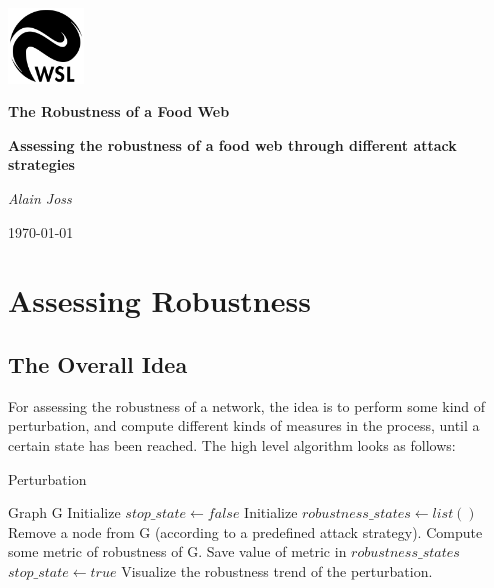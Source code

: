 \documentclass[a4paper, 12pt]{report}
\begin{document}

\begin{titlepage}
\centering
\includegraphics[width=0.15\textwidth]{wsl_logo.jpeg}\par\vspace{1cm}
\vspace{2.5cm}
{\huge\bfseries The Robustness of a Food Web  \par}
\vspace{0.5cm}
{\Large\bfseries Assessing the robustness of a food web through different attack strategies \par}
\vspace{3.5cm}
{\Large\itshape Alain Joss \par}
\vfill
{\large \today \par}
\end{titlepage}


\tableofcontents
\thispagestyle{empty}
\newpage


\chapter{Assessing Robustness}

\section{The Overall Idea}
For assessing the robustness of a network, 
the idea is to perform some kind of perturbation, 
and compute different kinds of measures in the process,
until a certain state has been reached.
The high level algorithm looks as follows:

\begin{algorithm}
    \caption{Perturbation}
    \begin{algorithmic}[1]
    \small
    \Require Graph G
    \State Initialize $stop\_state \gets false$
    \State Initialize $robustness\_states \gets list()$
        \State Remove a node from G (according to a predefined attack strategy).
        \State Compute some metric of robustness of G.
        \State Save value of metric in $robustness\_states$
            \State $stop\_state \gets true$
        \EndIf
    \EndWhile
    \State Visualize the robustness trend of the perturbation.
    \end{algorithmic}
\end{algorithm}
\end{document}
